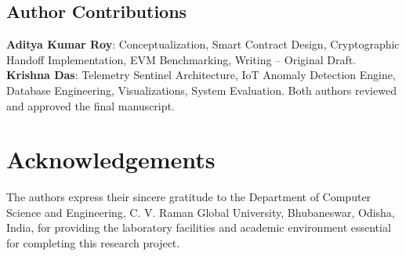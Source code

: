 \documentclass[pdflatex,sn-mathphys-num]{sn-jnl}
\theoremstyle{thmstyleone}
\theoremstyle{thmstyletwo}
\theoremstyle{thmstylethree}
\begin{document}
\subsection*{Author Contributions}
\textbf{Aditya Kumar Roy}: Conceptualization, Smart Contract Design, Cryptographic Handoff Implementation, EVM Benchmarking, Writing -- Original Draft. \textbf{Krishna Das}: Telemetry Sentinel Architecture, IoT Anomaly Detection Engine, Database Engineering, Visualizations, System Evaluation. Both authors reviewed and approved the final manuscript.


\section*{Acknowledgements}
The authors express their sincere gratitude to the Department of Computer Science and Engineering, C. V. Raman Global University, Bhubaneswar, Odisha, India, for providing the laboratory facilities and academic environment essential for completing this research project.

\end{document}
